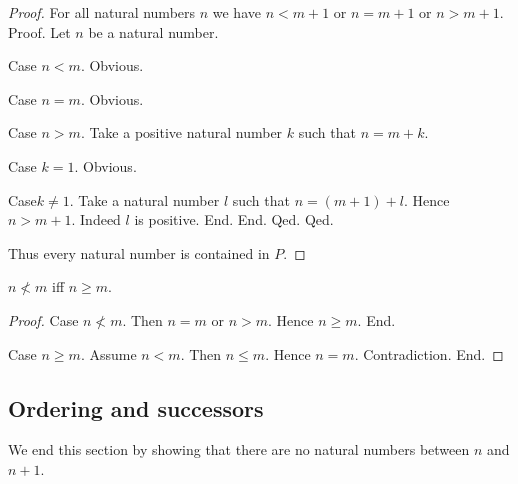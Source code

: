 \documentclass[../../arithmetic.tex]{subfiles}
\begin{document}
\begin{forthel}
\begin{proof}
        For all natural numbers $n$ we have $n < m + 1$ or $n = m + 1$ or $n > m + 1$. \\
        Proof.
          Let $n$ be a natural number.

          Case $n < m$. Obvious.

          Case $n = m$. Obvious.

          Case $n > m$.
            Take a positive natural number $k$ such that $n = m + k$.

            Case $k = 1$. Obvious.

            Case$k \neq 1$.
              Take a natural number $l$ such that $n = (m + 1) + l$.
              Hence $n > m + 1$.
              Indeed $l$ is positive.
            End.
          End.
        Qed.
      Qed.

      Thus every natural number is contained in $P$.
    \end{proof}


    \begin{proposition}\label{Arithmetic_02_01_112345}
      $n \nless m$ iff $n \geq m$.
    \end{proposition}
    \begin{proof}
      Case $n \nless m$.
        Then $n = m$ or $n > m$.
        Hence $n \geq m$.
      End.

      Case $n \geq m$.
        Assume $n < m$.
        Then $n \leq m$.
        Hence $n = m$.
        Contradiction.
      End.
    \end{proof}
  \end{forthel}


  \subsection{Ordering and successors}

  We end this section by showing that there are no natural numbers
  between $n$ and $n + 1$.
\end{document}
